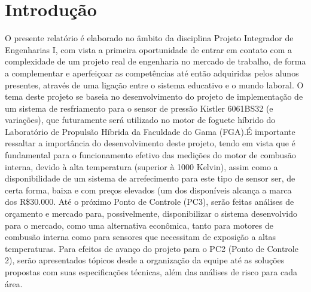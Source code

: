 \chapter{Introdução}
O presente relatório é elaborado no âmbito da disciplina Projeto Integrador de Engenharias I, com vista a primeira oportunidade de entrar em contato com a complexidade de um projeto real de engenharia no mercado de trabalho, de forma a complementar e aperfeiçoar as competências até então adquiridas pelos alunos presentes, através de uma ligação entre o sistema educativo e o mundo laboral. O tema deste projeto se baseia no desenvolvimento do projeto de implementação de um sistema de resfriamento para o sensor de pressão Kistler 6061BS32 (e variações), que futuramente será utilizado no motor de foguete híbrido do Laboratório de Propulsão Híbrida da Faculdade do Gama (FGA).É importante ressaltar a importância do desenvolvimento deste projeto, tendo em vista que é fundamental para o funcionamento efetivo das medições do motor de combusão interna, devido à alta temperatura (superior à 1000 Kelvin), assim como a disponibilidade de um sistema de arrefecimento para este tipo de sensor ser, de certa forma, baixa e com preços elevados (um dos disponíveis alcança a marca dos R\$30.000. Até o próximo Ponto de Controle (PC3), serão feitas análises de orçamento e mercado para, possivelmente, disponibilizar o sistema desenvolvido para o mercado, como uma alternativa econômica, tanto para motores de combusão interna como para sensores que necessitam de exposição a altas temperaturas. Para efeitos de avanço do projeto para o PC2 (Ponto de Controle 2), serão apresentados tópicos desde a organização da equipe até as soluções propostas com suas especificações técnicas, além das análises de risco para cada área. 

